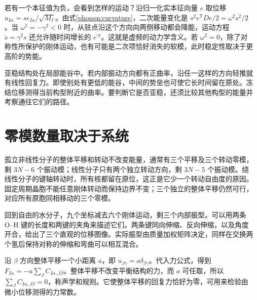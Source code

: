 若有一个本征值为负，会看到怎样的运动？沿归一化实本征向量 $e$ 取位移 $u_{I\alpha}=s e_{I\alpha}/\sqrt{M_I}$。由式\eqref{phonon:curvature}，二次能量变化是 $s^2 e^{\mathsf T}De/2=\omega^2s^2/2$。当 $\omega^2=-\gamma^2<0$ 时，从驻点沿这个方向向两侧移动都会降能，运动方程 $\ddot s=\gamma^2s$ 还允许随时间增长的 $e^{\gamma t}$。这就是虚频的动力学含义。若 $\omega^2=0$，除了对称性所保护的刚体运动，也有可能是二次项恰好消失的软模，此时稳定性取决于更高阶的势能。

亚稳结构处在局部能谷中。若内部振动方向都有正曲率，沿任一这样的方向轻推就有线性回复力。即使别处有更低的能谷，中间的势垒也可使它长时间留在原处。冻结位移测得当前构型附近的曲率。要判断它是否亚稳，还须比较其他构型的能量并考察通往它们的路径。

\section{零模数量取决于系统}
孤立非线性分子的整体平移和转动不改变能量，通常有三个平移及三个转动零模，剩 $3N-6$ 个振动模；线性分子只有两个独立转动方向，剩 $3N-5$ 个振动模。绕线性分子的键轴转动时，所有核都留在原位，这正是它少一个转动自由度的原因。固定周期晶胞不能任意刚体转动而保持边界不变；三个独立的整体平移仍然可行，对应所有原胞同相移动的三个零模。

回到自由的水分子，九个坐标减去六个刚体运动，剩三个内部振型。可以用两条 O--H 键的长度和两键的夹角来描述它们。两条键同向伸缩、反向伸缩，以及角度开合，给出了三个直观的位移图像。实际振型由质量加权矩阵决定，同样在交换两个氢后保持对称的伸缩和弯曲可以相互混合。

沿 $\beta$ 方向整体平移一个小距离 $a$，即 $u_{J\gamma}=a\delta_{\beta\gamma}$。代入力公式，得到 $F_{I\alpha}=-a\sum_JC_{I\alpha,J\beta}$。整体平移不改变平衡结构的力，而 $a$ 可任取，所以 $\sum_JC_{I\alpha,J\beta}=0$，称声学和规则。它使整体平移的回复力恰好为零，可用来检验由微小位移测得的力常数。

